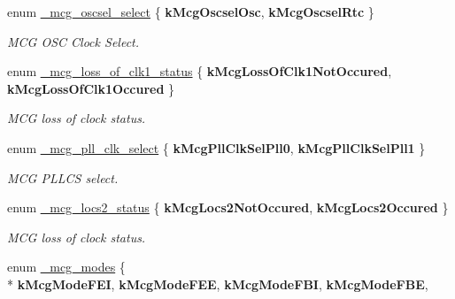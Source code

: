 \begin{DoxyCompactItemize}
\item 
enum \hyperlink{group__mcg__hal_gae2a02e7371d9bc1cdd3227a70508ac51}{\+\_\+mcg\+\_\+oscsel\+\_\+select} \{ {\bfseries k\+Mcg\+Oscsel\+Osc}, 
{\bfseries k\+Mcg\+Oscsel\+Rtc}
 \}\hypertarget{group__mcg__hal_gae2a02e7371d9bc1cdd3227a70508ac51}{}\label{group__mcg__hal_gae2a02e7371d9bc1cdd3227a70508ac51}
\begin{DoxyCompactList}\small\item\em M\+CG O\+SC Clock Select. \end{DoxyCompactList}
\item 
enum \hyperlink{group__mcg__hal_gaf726bc1387fab6c688fbc0e9f38fb939}{\+\_\+mcg\+\_\+loss\+\_\+of\+\_\+clk1\+\_\+status} \{ {\bfseries k\+Mcg\+Loss\+Of\+Clk1\+Not\+Occured}, 
{\bfseries k\+Mcg\+Loss\+Of\+Clk1\+Occured}
 \}\hypertarget{group__mcg__hal_gaf726bc1387fab6c688fbc0e9f38fb939}{}\label{group__mcg__hal_gaf726bc1387fab6c688fbc0e9f38fb939}
\begin{DoxyCompactList}\small\item\em M\+CG loss of clock status. \end{DoxyCompactList}
\item 
enum \hyperlink{group__mcg__hal_ga34b64ff2e935b09b3f3ae070da66b7d8}{\+\_\+mcg\+\_\+pll\+\_\+clk\+\_\+select} \{ {\bfseries k\+Mcg\+Pll\+Clk\+Sel\+Pll0}, 
{\bfseries k\+Mcg\+Pll\+Clk\+Sel\+Pll1}
 \}\hypertarget{group__mcg__hal_ga34b64ff2e935b09b3f3ae070da66b7d8}{}\label{group__mcg__hal_ga34b64ff2e935b09b3f3ae070da66b7d8}
\begin{DoxyCompactList}\small\item\em M\+CG P\+L\+L\+CS select. \end{DoxyCompactList}
\item 
enum \hyperlink{group__mcg__hal_ga219cdb1356ea8768f2f1c1867b3f2912}{\+\_\+mcg\+\_\+locs2\+\_\+status} \{ {\bfseries k\+Mcg\+Locs2\+Not\+Occured}, 
{\bfseries k\+Mcg\+Locs2\+Occured}
 \}\hypertarget{group__mcg__hal_ga219cdb1356ea8768f2f1c1867b3f2912}{}\label{group__mcg__hal_ga219cdb1356ea8768f2f1c1867b3f2912}
\begin{DoxyCompactList}\small\item\em M\+CG loss of clock status. \end{DoxyCompactList}
\item 
enum \hyperlink{group__mcg__hal_gacbfe9563601260b279eeb6d4a8c701e0}{\+\_\+mcg\+\_\+modes} \{ \\*
{\bfseries k\+Mcg\+Mode\+F\+EI}, 
{\bfseries k\+Mcg\+Mode\+F\+EE}, 
{\bfseries k\+Mcg\+Mode\+F\+BI}, 
{\bfseries k\+Mcg\+Mode\+F\+BE}, 

\end{DoxyCompactItemize}
